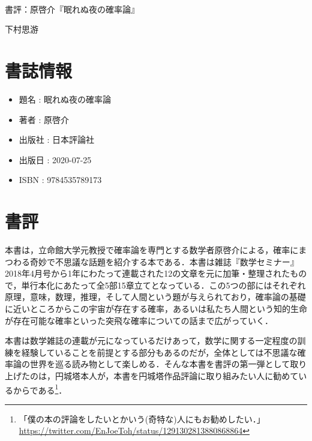 \documentclass[10pt, a5paper, twoside]{jsarticle}
\theoremstyle{definition}
\begin{document}
	~ %

	\begin{center}

		\Large{書評：原啓介『眠れぬ夜の確率論』}

		\vspace{3mm}
		
		\large{下村思游}

	\end{center}

	\section{書誌情報}

		\begin{itemize}
			
			\item 題名 : 眠れぬ夜の確率論

			\item 著者 : 原啓介

			\item 出版社 : 日本評論社

			\item 出版日 : 2020-07-25

			\item ISBN : 9784535789173
		
		\end{itemize}

	\section{書評}

		本書は，立命館大学元教授で確率論を専門とする数学者原啓介による，確率にまつわる奇妙で不思議な話題を紹介する本である．本書は雑誌『数学セミナー』2018年4月号から1年にわたって連載された12の文章を元に加筆・整理されたもので，単行本化にあたって全5部15章立てとなっている．この5つの部にはそれぞれ原理，意味，数理，推理，そして人間という題が与えられており，確率論の基礎に近いところからこの宇宙が存在する確率，あるいは私たち人間という知的生命が存在可能な確率といった突飛な確率についての話まで広がっていく．

		本書は数学雑誌の連載が元になっているだけあって，数学に関する一定程度の訓練を経験していることを前提とする部分もあるのだが，全体としては不思議な確率論の世界を巡る読み物として楽しめる．そんな本書を書評の第一弾として取り上げたのは，円城塔本人が，本書を円城塔作品評論に取り組みたい人に勧めているからである\footnote{「僕の本の評論をしたいとかいう(奇特な)人にもお勧めしたい．」 \\ \url{https://twitter.com/EnJoeToh/status/1291302813880868864}}．
\end{document}
